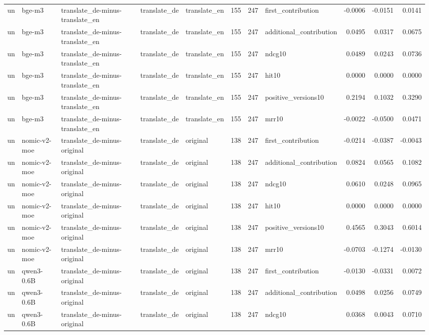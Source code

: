 \begin{tabular}{lllllrrlrrr}
un & bge-m3 & translate\_de-minus-translate\_en & translate\_de & translate\_en & 155 & 247 & first\_contribution & -0.0006 & -0.0151 & 0.0141 \\
un & bge-m3 & translate\_de-minus-translate\_en & translate\_de & translate\_en & 155 & 247 & additional\_contribution & 0.0495 & 0.0317 & 0.0675 \\
un & bge-m3 & translate\_de-minus-translate\_en & translate\_de & translate\_en & 155 & 247 & ndcg10 & 0.0489 & 0.0243 & 0.0736 \\
un & bge-m3 & translate\_de-minus-translate\_en & translate\_de & translate\_en & 155 & 247 & hit10 & 0.0000 & 0.0000 & 0.0000 \\
un & bge-m3 & translate\_de-minus-translate\_en & translate\_de & translate\_en & 155 & 247 & positive\_versions10 & 0.2194 & 0.1032 & 0.3290 \\
un & bge-m3 & translate\_de-minus-translate\_en & translate\_de & translate\_en & 155 & 247 & mrr10 & -0.0022 & -0.0500 & 0.0471 \\
un & nomic-v2-moe & translate\_de-minus-original & translate\_de & original & 138 & 247 & first\_contribution & -0.0214 & -0.0387 & -0.0043 \\
un & nomic-v2-moe & translate\_de-minus-original & translate\_de & original & 138 & 247 & additional\_contribution & 0.0824 & 0.0565 & 0.1082 \\
un & nomic-v2-moe & translate\_de-minus-original & translate\_de & original & 138 & 247 & ndcg10 & 0.0610 & 0.0248 & 0.0965 \\
un & nomic-v2-moe & translate\_de-minus-original & translate\_de & original & 138 & 247 & hit10 & 0.0000 & 0.0000 & 0.0000 \\
un & nomic-v2-moe & translate\_de-minus-original & translate\_de & original & 138 & 247 & positive\_versions10 & 0.4565 & 0.3043 & 0.6014 \\
un & nomic-v2-moe & translate\_de-minus-original & translate\_de & original & 138 & 247 & mrr10 & -0.0703 & -0.1274 & -0.0130 \\
un & qwen3-0.6B & translate\_de-minus-original & translate\_de & original & 138 & 247 & first\_contribution & -0.0130 & -0.0331 & 0.0072 \\
un & qwen3-0.6B & translate\_de-minus-original & translate\_de & original & 138 & 247 & additional\_contribution & 0.0498 & 0.0256 & 0.0749 \\
un & qwen3-0.6B & translate\_de-minus-original & translate\_de & original & 138 & 247 & ndcg10 & 0.0368 & 0.0043 & 0.0710 \\

\end{tabular}
